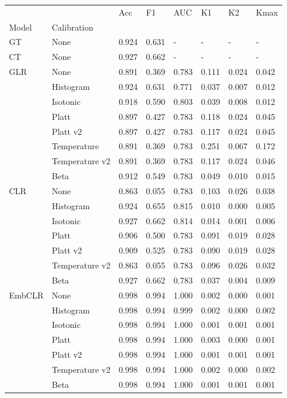 \begin{tabular}{llllllll}
\toprule
 &  & Acc & F1 & AUC & K1 & K2 & Kmax \\
Model & Calibration &  &  &  &  &  &  \\
\midrule
GT & None & 0.924 & 0.631 & - & - & - & - \\
\cline{1-8}
CT & None & 0.927 & 0.662 & - & - & - & - \\
\cline{1-8}
\multirow[t]{8}{*}{GLR} & None & 0.891 & 0.369 & 0.783 & 0.111 & 0.024 & 0.042 \\
 & Histogram & 0.924 & 0.631 & 0.771 & 0.037 & 0.007 & 0.012 \\
 & Isotonic & 0.918 & 0.590 & 0.803 & 0.039 & 0.008 & 0.012 \\
 & Platt & 0.897 & 0.427 & 0.783 & 0.118 & 0.024 & 0.045 \\
 & Platt v2 & 0.897 & 0.427 & 0.783 & 0.117 & 0.024 & 0.045 \\
 & Temperature & 0.891 & 0.369 & 0.783 & 0.251 & 0.067 & 0.172 \\
 & Temperature v2 & 0.891 & 0.369 & 0.783 & 0.117 & 0.024 & 0.046 \\
 & Beta & 0.912 & 0.549 & 0.783 & 0.049 & 0.010 & 0.015 \\
\cline{1-8}
\multirow[t]{7}{*}{CLR} & None & 0.863 & 0.055 & 0.783 & 0.103 & 0.026 & 0.038 \\
 & Histogram & 0.924 & 0.655 & 0.815 & 0.010 & 0.000 & 0.005 \\
 & Isotonic & 0.927 & 0.662 & 0.814 & 0.014 & 0.001 & 0.006 \\
 & Platt & 0.906 & 0.500 & 0.783 & 0.091 & 0.019 & 0.028 \\
 & Platt v2 & 0.909 & 0.525 & 0.783 & 0.090 & 0.019 & 0.028 \\
 & Temperature v2 & 0.863 & 0.055 & 0.783 & 0.096 & 0.026 & 0.032 \\
 & Beta & 0.927 & 0.662 & 0.783 & 0.037 & 0.004 & 0.009 \\
\cline{1-8}
\multirow[t]{7}{*}{EmbCLR} & None & 0.998 & 0.994 & 1.000 & 0.002 & 0.000 & 0.001 \\
 & Histogram & 0.998 & 0.994 & 0.999 & 0.002 & 0.000 & 0.002 \\
 & Isotonic & 0.998 & 0.994 & 1.000 & 0.001 & 0.001 & 0.001 \\
 & Platt & 0.998 & 0.994 & 1.000 & 0.003 & 0.000 & 0.001 \\
 & Platt v2 & 0.998 & 0.994 & 1.000 & 0.001 & 0.001 & 0.001 \\
 & Temperature v2 & 0.998 & 0.994 & 1.000 & 0.002 & 0.000 & 0.002 \\
 & Beta & 0.998 & 0.994 & 1.000 & 0.001 & 0.001 & 0.001 \\
\cline{1-8}
\bottomrule
\end{tabular}
